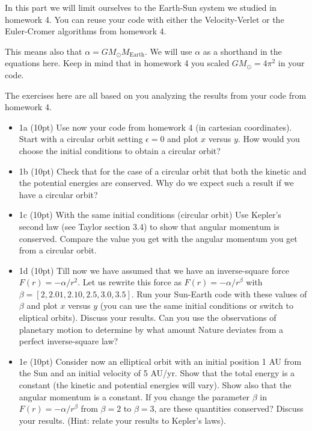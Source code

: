 \documentclass[%
oneside,                 %
final,                   %
10pt]{article}
\begin{document}
In this part we will limit ourselves to the Earth-Sun system we studied in homework 4. You can reuse your code with either the Velocity-Verlet or the Euler-Cromer algorithms from homework 4.

This means also that $\alpha=GM_{\odot}M_{\mathrm{Earth}}$. We will
use $\alpha$ as a shorthand in the equations here. Keep in mind that
in homework 4 you scaled $GM_{\odot}=4\pi^2$ in your code.

The exercises here are all based on you analyzing the results from your code from homework 4.


\begin{itemize}
\item 1a (10pt) Use now your code from homework 4 (in cartesian coordinates). Start with a circular orbit setting $\epsilon=0$ and plot $x$ versus $y$. How would you choose the initial conditions to obtain a circular orbit?

\item 1b (10pt) Check that for the case of a circular orbit that both the kinetic and the potential energies are conserved. Why do we expect such a result if we have a circular orbit? 

\item 1c (10pt) With the same initial conditions (circular orbit) Use Kepler's second law (see Taylor section 3.4) to show that angular momentum is conserved. Compare the value you get with the angular momentum you get from a circular orbit. 

\item 1d (10pt) Till now we have assumed that we have an inverse-square force $F(r) = -\alpha/r^2$. Let us rewrite this force as $F(r) = -\alpha/r^{\beta}$ with $\beta=[2,2.01,2.10,2.5,3.0,3.5]$. Run your Sun-Earth code with these values of $\beta$ and plot $x$ versus $y$ (you can use the same initial conditions or switch to eliptical orbits). Discuss your results. Can you use the observations of planetary motion to determine by what amount Nature deviates from a perfect inverse-square law? 

\item 1e (10pt) Consider now an elliptical orbit with an initial position 1 AU from the Sun and an initial  velocity of 5 AU/yr. Show that the total energy is a constant (the kinetic and potential energies will vary). Show also that the angular momentum is a constant. If you change the parameter $\beta$ in $F(r) = -\alpha/r^{\beta}$ from $\beta=2$ to $\beta=3$, are these quantities conserved?  Discuss your results. (Hint: relate your results to Kepler's laws). 
\end{itemize}
\end{document}
